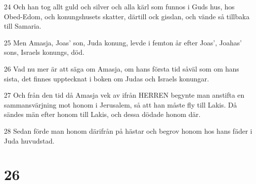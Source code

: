 \par 24 Och han tog allt guld och silver och alla kärl som funnos i Guds hus, hos Obed-Edom, och konungshusets skatter, därtill ock gisslan, och vände så tillbaka till Samaria.
\par 25 Men Amasja, Joas' son, Juda konung, levde i femton år efter Joas', Joahas' sons, Israels konungs, död.
\par 26 Vad nu mer är att säga om Amasja, om hans första tid såväl som om hans sista, det finnes upptecknat i boken om Judas och Israels konungar.
\par 27 Och från den tid då Amasja vek av ifrån HERREN begynte man anstifta en sammansvärjning mot honom i Jerusalem, så att han måste fly till Lakis. Då sändes män efter honom till Lakis, och dessa dödade honom där.
\par 28 Sedan förde man honom därifrån på hästar och begrov honom hos hans fäder i Juda huvudstad.

\chapter{26}

